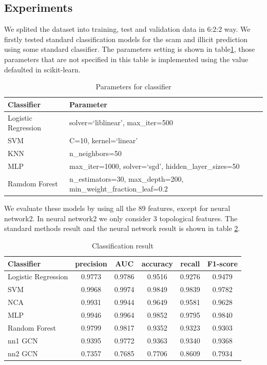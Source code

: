 \subsection{Experiments}
We splited the dataset into training, test and validation data in 6:2:2 way. We firstly tested standard classification models for the scam and illicit prediction using some standard classifier. The parameters setting is shown in table\ref{table:classifier-parameter}, those parameters that are not specified in this table is implemented using the value defaulted in scikit-learn\cite{pedregosa2011scikit}.
\begin{table}[htbp]
\centering
 \caption{Parameters for classifier\label{table:classifier-parameter}}
 \begin{tabularx}{0.3\textwidth}{XX}
  \toprule
 Classifier&  Parameter \\
  \midrule
 Logistic Regression & solver=`liblinear', max\_iter=500\\
 SVM & C=10, kernel=`linear' \\
  KNN & n\_neighbors=50\\
  MLP & max\_iter=1000, solver=`sgd', hidden\_layer\_sizes=50 \\ 
  Ramdom Forest & n\_estimators=30, max\_depth=200,  min\_weight\_fraction\_leaf=0.2\\ 
  \bottomrule
 \end{tabularx}
\end{table}

We evaluate these models by using all the 89 features, except for neural network2. In neural network2 we only consider 3 topological features. The standard methods result and the neural network result is shown in table \ref{table:classifier-result}.

\begin{table}
\centering
 \caption{Classification result\label{table:classifier-result}}
    \begin{tabularx}{0.49\textwidth}{>{\centering\arraybackslash}X|ccccc}
		\hline \textbf{Classifier} & \textbf{precision}  &\textbf{AUC} & \textbf{accuracy} &\textbf{recall}&\textbf{F1-score}\\
		 \hline Logistic    Regression & 0.9773& 0.9786 & 0.9516 & 0.9276 & 0.9479\\
		 SVM & 0.9968  & 0.9974 & 0.9849 &0.9839 &0.9782\\  
		 NCA & 0.9931& 0.9944 & 0.9649 & 0.9581 & 0.9628\\
		 MLP &0.9946 & 0.9964 &0.9852 & 0.9795& 0.9840\\
		 Random Forest & 0.9799& 0.9817 & 0.9352 &0.9323 &0.9303 \\
		 nn1 GCN & 0.9395 & 0.9772 & 0.9363 & 0.9340 & 0.9368 \\
         nn2 GCN & 0.7357& 0.7685& 0.7706&0.8609 & 0.7934\\


	     \hline
    \end{tabularx}
\end{table}

